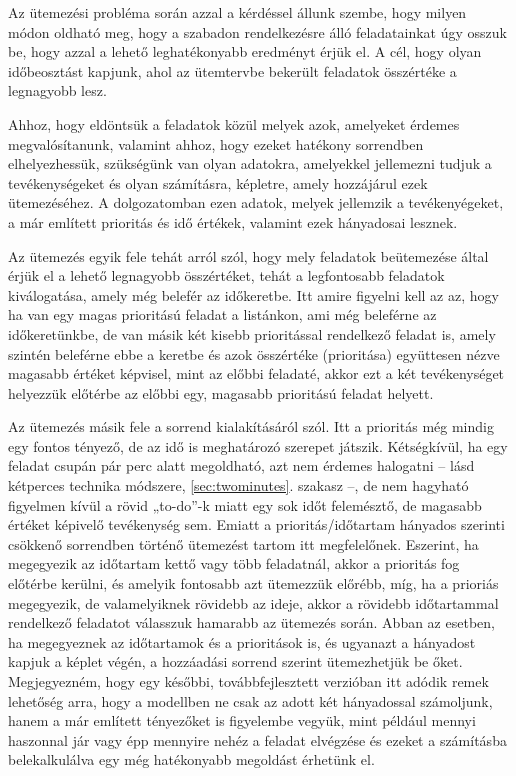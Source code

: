 

Az ütemezési probléma során azzal a kérdéssel állunk szembe, hogy milyen módon oldható meg, hogy a szabadon rendelkezésre álló feladatainkat úgy osszuk be, hogy azzal a lehető leghatékonyabb eredményt érjük el. A cél, hogy olyan időbeosztást kapjunk, ahol az ütemtervbe bekerült feladatok összértéke a legnagyobb lesz. 

Ahhoz, hogy eldöntsük a feladatok közül melyek azok, amelyeket érdemes megvalósítanunk, valamint ahhoz, hogy ezeket hatékony sorrendben elhelyezhessük, szükségünk van olyan adatokra, amelyekkel jellemezni tudjuk a tevékenységeket és olyan számításra, képletre, amely hozzájárul ezek ütemezéséhez. A dolgozatomban ezen adatok, melyek jellemzik a tevékenyégeket, a már említett prioritás és idő értékek, valamint ezek hányadosai lesznek. 

Az ütemezés egyik fele tehát arról szól, hogy mely feladatok beütemezése által érjük el a lehető legnagyobb összértéket, tehát a legfontosabb feladatok kiválogatása, amely még belefér az időkeretbe. Itt amire figyelni kell az az, hogy ha van egy magas prioritású feladat a listánkon, ami még beleférne az időkeretünkbe, de van másik két kisebb prioritással rendelkező feladat is, amely szintén beleférne ebbe a keretbe és azok összértéke (prioritása) együttesen nézve magasabb értéket képvisel, mint az előbbi feladaté, akkor ezt a két tevékenységet helyezzük előtérbe az előbbi egy, magasabb prioritású feladat helyett.

Az ütemezés másik fele a sorrend kialakításáról szól. Itt a prioritás még mindig egy fontos tényező, de az idő is meghatározó szerepet játszik. Kétségkívül, ha egy feladat csupán pár perc alatt megoldható, azt nem érdemes halogatni -- lásd kétperces technika módszere, \ref{sec:twominutes}. szakasz --, de nem hagyható figyelmen kívül a rövid „to-do”-k miatt egy sok időt felemésztő, de magasabb értéket képivelő tevékenység sem. Emiatt a prioritás/időtartam hányados szerinti csökkenő sorrendben történő ütemezést tartom itt megfelelőnek. Eszerint, ha megegyezik az időtartam kettő vagy több feladatnál, akkor a prioritás fog előtérbe kerülni, és amelyik fontosabb azt ütemezzük előrébb, míg, ha a prioriás megegyezik, de valamelyiknek rövidebb az ideje, akkor a rövidebb időtartammal rendelkező feladatot válasszuk hamarabb az ütemezés során. Abban az esetben, ha megegyeznek az időtartamok és a prioritások is, és ugyanazt a hányadost kapjuk a képlet végén, a hozzáadási sorrend szerint ütemezhetjük be őket. Megjegyezném, hogy egy későbbi, továbbfejlesztett verzióban itt adódik remek lehetőség arra, hogy a modellben ne csak az adott két hányadossal számoljunk, hanem a már említett tényezőket is figyelembe vegyük, mint például mennyi haszonnal jár vagy épp mennyire nehéz a feladat elvégzése és ezeket a számításba belekalkulálva egy még hatékonyabb megoldást érhetünk el.

